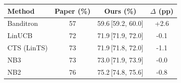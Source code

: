 \begin{tabular}{lccc}
\toprule
Method & Paper (\%) & Ours (\%) & $\Delta$ (pp) \\
\midrule
Banditron & 57 & 59.6\,[59.2, 60.0] & +2.6 \\
LinUCB & 72 & 71.9\,[71.9, 72.0] & -0.1 \\
CTS (LinTS) & 73 & 71.9\,[71.8, 72.0] & -1.1 \\
NB3 & 73 & 73.0\,[71.9, 73.9] & -0.0 \\
NB2 & 76 & 75.2\,[74.8, 75.6] & -0.8 \\
\bottomrule
\end{tabular}
